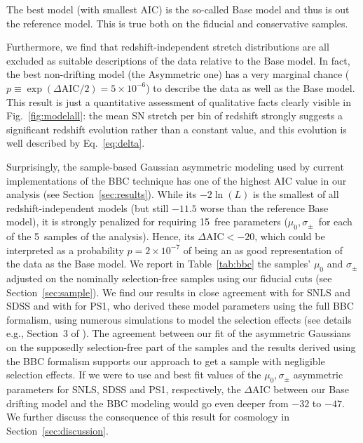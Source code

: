 \documentclass[]{aa} %
\newcommand{\agk}[1]{\textcolor{purple}{AK: #1}}
\begin{document}
The best model (with smallest AIC) is the so-called Base
model and thus is out the reference model. This is true both on the fiducial and conservative samples. 


Furthermore, we find that redshift-independent stretch distributions are all
excluded as suitable descriptions of the data relative to the Base model.  In
fact, the best non-drifting model (the Asymmetric one) has a very marginal
chance ($p \equiv \exp\left(\Delta\mathrm{AIC}/2\right) = 5\times10^{-6}$) to
describe the data as well as the Base model. This result is just a quantitative
assessment of qualitative facts clearly visible in Fig.~\ref{fig:modelall}: the
mean SN stretch per bin of redshift strongly suggests a significant redshift
evolution rather than a constant value, and this evolution is well described by
Eq.~\ref{eq:delta}.

Surprisingly, the sample-based Gaussian asymmetric modeling used by current implementations of the BBC technique \citep{scolnic2016, kessler2017} has one of the highest AIC value
in our analysis (see Section~\ref{sec:results}). While
its $-2\ln(L)$ is the smallest of all redshift-independent models (but still
$-11.5$ worse than the reference Base model), it is strongly penalized for
requiring 15~free parameters ($\mu_0, \sigma_{\pm}$~for each of the 5~samples of
the analysis).
Hence, its $\Delta\mathrm{AIC}<-20$, which could be interpreted
as a probability $p=2\times 10^{-7}$ of being an as good representation of the
data as the Base model. We report in Table~\ref{tab:bbc} the samples' $\mu_0$
and $\sigma_{\pm}$ adjusted on the nominally selection-free samples using our
fiducial cuts (see Section~\ref{sec:sample}). We find our results in close
agreement with \cite{scolnic2016} for SNLS and SDSS and with \cite{scolnic2018a}
for PS1, who derived these model parameters using the full BBC formalism, using
numerous simulations to model the selection effects (see details e.g., Section~3
of \citealt{kessler2017}). The agreement between our fit of the asymmetric
Gaussians on the supposedly selection-free part of the samples and the results
derived using the BBC formalism supports our approach to get a sample with
negligible selection effects. If we were to use \cite{scolnic2016} and
\cite{scolnic2018a} best fit values of the $\mu_0, \sigma_{\pm}$ asymmetric
parameters for SNLS, SDSS and PS1, respectively, the $\Delta$AIC between our
Base drifting model and the BBC modeling would go even deeper from $-32$ to
$-47$. We further discuss the consequence of this result for cosmology in
Section~\ref{sec:discussion}.
    
\end{document}
